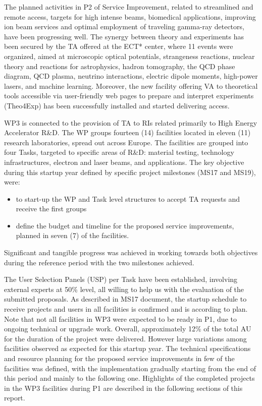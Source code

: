 The planned activities in P2 of Service Improvement, related to streamlined and remote access, targets for high intense beams, biomedical applications, improving ion beam services and optimal employment of traveling gamma-ray detectors, have been progressing well. The synergy between theory and experiments has been secured by the TA offered at the ECT* center, where 11 events were organized, aimed at microscopic optical potentials, strangeness reactions, nuclear theory and reactions for astrophysics, hadron tomography, the QCD phase diagram, QCD plasma, neutrino interactions, electric dipole moments, high-power lasers, and machine learning. Moreover, the new facility offering VA to theoretical tools accessible via user-friendly web pages to prepare and interpret experiments (Theo4Exp) has been successfully installed and started delivering access.
 
WP3 is connected to the provision of TA to RIs related primarily to High Energy Accelerator R\&D. The WP groups fourteen (14) facilities located in eleven (11) research laboratories, spread out across Europe. The facilities are grouped into four Tasks, targeted to specific areas of R\&D: material testing, technology infrastructures, electron and laser beams, and applications. 
The key objective during this startup year defined by specific project milestones (MS17 and MS19), were:
\begin{itemize}
    \item to start-up the WP and Task level structures to accept TA requests and receive the first groups
    \item define the budget and timeline for the proposed service improvements, planned in seven (7) of the facilities.
\end{itemize}
Significant and tangible progress was achieved in working towards both objectives during the reference period with the two milestones achieved. 

The User Selection Panels (USP) per Task have been established, involving external experts at 50\% level, all willing to help us with the evaluation of the submitted proposals. As described in MS17 document, the startup schedule to receive projects and users in all facilities is confirmed and is according to plan. Note that not all facilities in WP3 were expected to be ready in P1, due to ongoing technical or upgrade work. Overall, approximately 12\% of the total AU for the duration of the project were delivered. However large variations among facilities observed as expected for this startup year. The technical specifications and resource planning for the proposed service improvements in few of the facilities was defined, with the implementation gradually starting from the end of this period and mainly to the following one. Highlights of the completed projects in the WP3 facilities during P1 are described in the following sections of this report.

